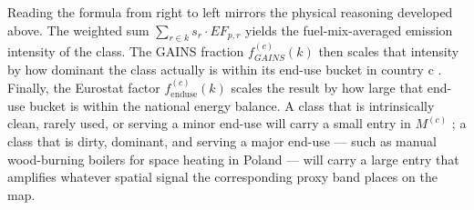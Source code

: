 Reading the formula from right to left mirrors the physical reasoning developed above. The weighted sum $\sum_{r \in k} s_r \cdot EF_{p,r}$ yields the fuel-mix-averaged emission intensity of the class. The GAINS fraction $f_{GAINS}^{(c)} (k)$ then scales that intensity by how dominant the class actually is within its end-use bucket in country  c . Finally, the Eurostat factor $f_{\mathrm{enduse}}^{(c)}(k)$ scales the result by how large that end-use bucket is within the national energy balance. A class that is intrinsically clean, rarely used, or serving a minor end-use will carry a small entry in $M^{(c)}$ ; a class that is dirty, dominant, and serving a major end-use --- such as manual wood-burning boilers for space heating in Poland --- will carry a large entry that amplifies whatever spatial signal the corresponding proxy band places on the map.